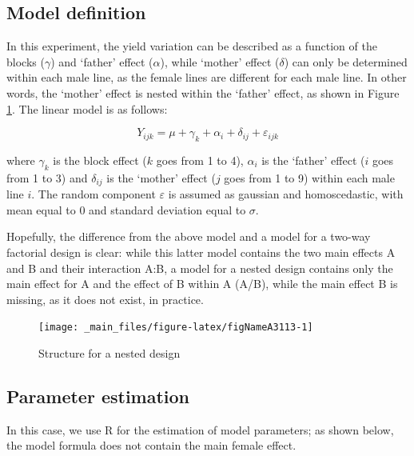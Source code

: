 \documentclass[a4paper,12pt,oneside]{book}
\begin{document}
\hypertarget{model-definition-3}{%
\subsection{Model definition}\label{model-definition-3}}

In this experiment, the yield variation can be described as a function of the blocks (\(\gamma\)) and `father' effect (\(\alpha\)), while `mother' effect (\(\delta\)) can only be determined within each male line, as the female lines are different for each male line. In other words, the `mother' effect is nested within the `father' effect, as shown in Figure \ref{fig:figNameA3113}. The linear model is as follows:

\[Y_{ijk} = \mu + \gamma_k + \alpha_i + \delta_{ij} + \varepsilon_{ijk}\]

where \(\gamma_k\) is the block effect (\(k\) goes from 1 to 4), \(\alpha_i\) is the `father' effect (\(i\) goes from 1 to 3) and \(\delta_{ij}\) is the `mother' effect (\(j\) goes from 1 to 9) within each male line \(i\). The random component \(\varepsilon\) is assumed as gaussian and homoscedastic, with mean equal to 0 and standard deviation equal to \(\sigma\).

Hopefully, the difference from the above model and a model for a two-way factorial design is clear: while this latter model contains the two main effects A and B and their interaction A:B, a model for a nested design contains only the main effect for A and the effect of B within A (A/B), while the main effect B is missing, as it does not exist, in practice.

\begin{figure}

{\centering \texttt{[image: \_main\_files/figure-latex/figNameA3113-1]} 

}

\caption{Structure for a nested design}\label{fig:figNameA3113}
\end{figure}

\hypertarget{parameter-estimation-1}{%
\subsection{Parameter estimation}\label{parameter-estimation-1}}

In this case, we use R for the estimation of model parameters; as shown below, the model formula does not contain the main female effect.

\vspace{12pt}
\scriptsize
\end{document}
